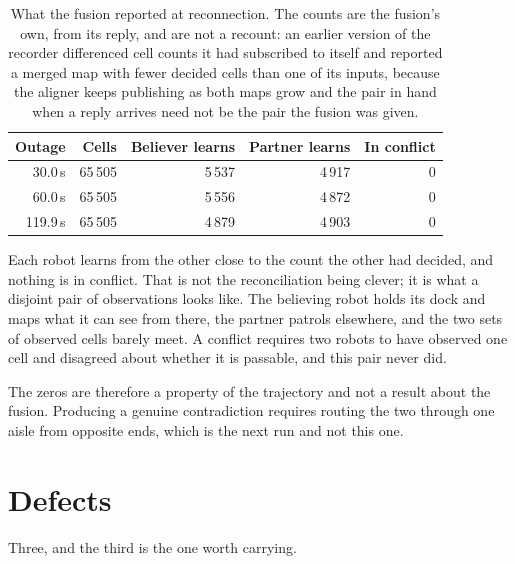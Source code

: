 \documentclass[11pt,a4paper]{article}
\theoremstyle{definition}
\begin{document}
\begin{table}[H]
\centering\small
\caption{What the fusion reported at reconnection. The counts are the
fusion's own, from its reply, and are not a recount: an earlier version of the
recorder differenced cell counts it had subscribed to itself and reported a
merged map with fewer decided cells than one of its inputs, because the aligner
keeps publishing as both maps grow and the pair in hand when a reply arrives
need not be the pair the fusion was given.}
\label{tab:fusion}
\begin{tabular}{@{}rrrrr@{}}
\toprule
\textbf{Outage} & \textbf{Cells} & \textbf{Believer learns} &
\textbf{Partner learns} & \textbf{In conflict} \\
\midrule
 30.0\,s & 65\,505 & 5\,537 & 4\,917 & 0 \\
 60.0\,s & 65\,505 & 5\,556 & 4\,872 & 0 \\
119.9\,s & 65\,505 & 4\,879 & 4\,903 & 0 \\
\bottomrule
\end{tabular}
\end{table}

Each robot learns from the other close to the count the other had decided, and
nothing is in conflict. That is not the reconciliation being clever; it is what
a disjoint pair of observations looks like. The believing robot holds its dock
and maps what it can see from there, the partner patrols elsewhere, and the two
sets of observed cells barely meet. A conflict requires two robots to have
observed one cell and disagreed about whether it is passable, and this pair
never did.

The zeros are therefore a property of the trajectory and not a result about the
fusion. Producing a genuine contradiction requires routing the two through one
aisle from opposite ends, which is the next run and not this one.

\section{Defects}
\label{sec:defects}

Three, and the third is the one worth carrying.
\end{document}
